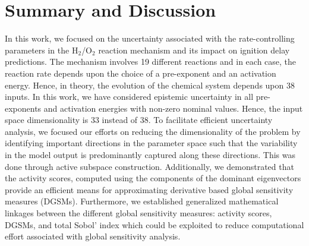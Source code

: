 \section{Summary and Discussion}
\label{sec:conc}

%
 
In this work, we focused on the uncertainty associated with the
rate-controlling parameters in the H$_2$/O$_2$ reaction mechanism and its
impact on ignition delay predictions. The mechanism involves 19 different
reactions and in each case, the reaction rate depends upon the choice of a
pre-exponent and an activation energy. Hence, in theory, the evolution of the
chemical system depends upon 38 inputs. In this work, we have considered 
epistemic uncertainty in all pre-exponents and activation energies with non-zero
nominal values. Hence, the input space dimensionality is 33 instead of 38.  
To facilitate efficient uncertainty analysis, we focused our efforts on
reducing the dimensionality of the problem by identifying important directions
in the parameter space such that the variability in the model output is
predominantly captured along these directions. This was done through active
subspace construction.  Additionally, we demonstrated that the activity scores,
computed using the components of the dominant eigenvectors provide an efficient
means for approximating derivative based global sensitivity measures (DGSMs).
Furthermore, we established generalized mathematical linkages between the
different global sensitivity measures: activity scores, DGSMs, and total Sobol'
index which could be exploited to reduce computational effort associated with
global sensitivity analysis. 
 

